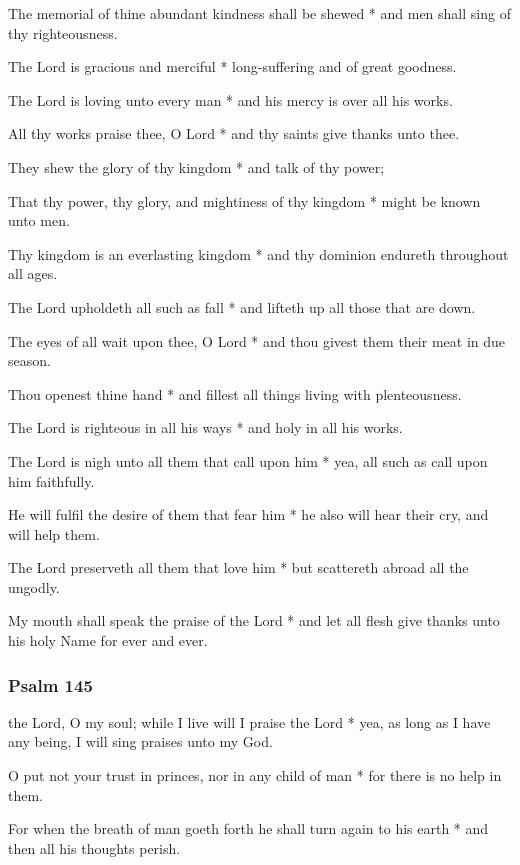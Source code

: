 The memorial of thine abundant kindness shall be shewed * and men shall sing of thy righteousness.

The Lord is gracious and merciful * long-suffering and of great goodness.

The Lord is loving unto every man * and his mercy is over all his works.

All thy works praise thee, O Lord * and thy saints give thanks unto thee.

They shew the glory of thy kingdom * and talk of thy power;

That thy power, thy glory, and mightiness of thy kingdom * might be known unto men.

Thy kingdom is an everlasting kingdom * and thy dominion endureth throughout all ages.

The Lord upholdeth all such as fall * and lifteth up all those that are down.

The eyes of all wait upon thee, O Lord * and thou givest them their meat in due season.

Thou openest thine hand * and fillest all things living with plenteousness.

The Lord is righteous in all his ways * and holy in all his works.

The Lord is nigh unto all them that call upon him * yea, all such as call upon him faithfully.

He will fulfil the desire of them that fear him * he also will hear their cry, and will help them.

The Lord preserveth all them that love him * but scattereth abroad all the ungodly.

My mouth shall speak the praise of the Lord * and let all flesh give thanks unto his holy Name for ever and ever.

\subsubsection{Psalm 145}


 the Lord, O my soul; while I live will I praise the Lord * yea, as long as I have any being, I will sing praises unto my God.

O put not your trust in princes, nor in any child of man * for there is no help in them.

For when the breath of man goeth forth he shall turn again to his earth * and then all his thoughts perish.

